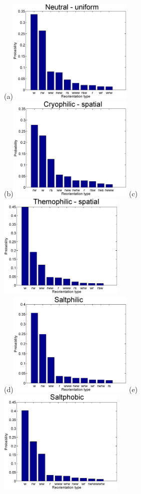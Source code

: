 \documentclass[12pt]{article}
\begin{document}
\begin{figure}
  \begin{center}
    (a)\includegraphics[width=6cm]{ReoTypeProb-neutraliso.eps}\\[1cm]
    (b)\includegraphics[width=6cm]{ReoTypeProb-cryospat.eps}
    (c)\includegraphics[width=6cm]{ReoTypeProb-thermospat.eps}\\[1cm]
    (d)\includegraphics[width=6cm]{ReoTypeProb-lowsalt.eps}
    (e)\includegraphics[width=6cm]{ReoTypeProb-highsalt.eps}

\end{center}
\end{figure}
\end{document}
